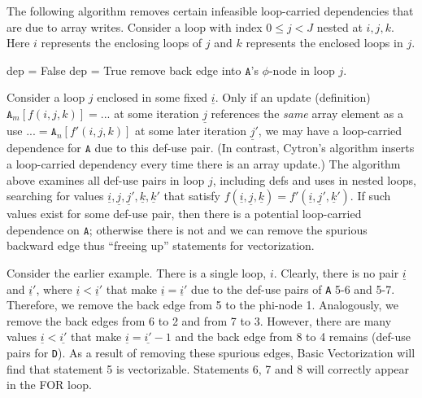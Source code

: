 \documentclass[sigconf, screen, natbib=false, dvipsnames, table]{acmart}
\theoremstyle{definition}
\begin{document}
The following algorithm removes certain infeasible loop-carried dependencies that are due to array writes. Consider a loop with index $0 \le j < J$
nested at $i,j,k$. Here $i$ represents the enclosing loops of $j$ and $k$ represents the enclosed loops in $j$.

\begin{algorithmic}
\STATE {}
\STATE dep = False
\STATE dep = True
\ENDIF
\ENDFOR
{}
\STATE remove back edge into $\texttt{A}$'s $\phi$-node in loop $j$.
\ENDIF
\ENDFOR
\end{algorithmic}

Consider a loop $j$ enclosed in some fixed $\underline{i}$. Only if an update (definition) $\texttt{A}_m[f(i,j,k)] = ... $ at some iteration $\underline{j}$
references the \emph{same} array element as a use $ ... = \texttt{A}_n[f'(i,j,k)]$ at some later iteration $\underline{j}'$,
we may have a loop-carried dependence for $\texttt{A}$ due to this def-use pair. (In contrast, Cytron's algorithm inserts a loop-carried dependency every time there is an array update.)
The algorithm above examines all def-use pairs in loop $j$, including defs and uses in nested loops, searching for values $\underline{i}, \underline{j}, \underline{j}', \underline{k}, \underline{k}'$ that satisfy
$f(\underline{i},\underline{j},\underline{k}) = f'(\underline{i},\underline{j}',\underline{k}')$. If such values exist for some def-use pair, then there is a potential
loop-carried dependence on $\texttt{A}$; otherwise there is not and we can remove the spurious backward edge thus ``freeing up'' statements for vectorization. %

Consider the earlier example. There is a single loop, $i$. Clearly, there is no pair $\underline{i}$ and $\underline{i}'$, where $\underline{i} < \underline{i}'$ that make $\underline{i} = \underline{i}'$ 
due to the def-use pairs of \texttt{A} 5-6 and 5-7.
Therefore, we remove the back edge from 5 to the phi-node 1. Analogously, we remove the back edges from 6 to 2 and from 7 to 3. However, there are many values $\underline{i} < \underline{i'}$ that make $\underline{i} = \underline{i'}-1$ and the back edge from 8 to 4 remains (def-use pairs for \texttt{D}). As a result of removing these spurious edges, Basic Vectorization will find that statement 5 is vectorizable. Statements 6, 7 and 8 will correctly appear in the FOR loop.
\end{document}
